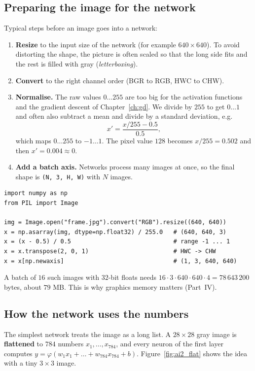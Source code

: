 \subsection*{Preparing the image for the network}
Typical steps before an image goes into a network:
\begin{enumerate}[nosep]
  \item \textbf{Resize} to the input size of the network (for example $640\times640$). To avoid distorting the shape, the picture is often scaled so that the long side fits and the rest is filled with gray (\emph{letterboxing}).
  \item \textbf{Convert} to the right channel order (BGR to RGB, HWC to CHW).
  \item \textbf{Normalise.} The raw values $0\ldots255$ are too big for the activation functions and the gradient descent of Chapter~\ref{ch:gd}. We divide by $255$ to get $0\ldots1$ and often also subtract a mean and divide by a standard deviation, e.g.
  \[
  x'=\frac{x/255-0.5}{0.5},
  \]
  which maps $0\ldots255$ to $-1\ldots1$. The pixel value $128$ becomes $x/255=0.502$ and then $x'=0.004\approx0$.
  \item \textbf{Add a batch axis.} Networks process many images at once, so the final shape is \texttt{(N, 3, H, W)} with $N$ images.
\end{enumerate}
\begin{verbatim}
import numpy as np
from PIL import Image

img = Image.open("frame.jpg").convert("RGB").resize((640, 640))
x = np.asarray(img, dtype=np.float32) / 255.0   # (640, 640, 3)
x = (x - 0.5) / 0.5                             # range -1 ... 1
x = x.transpose(2, 0, 1)                        # HWC -> CHW
x = x[np.newaxis]                               # (1, 3, 640, 640)
\end{verbatim}
A batch of $16$ such images with $32$-bit floats needs $16\cdot3\cdot640\cdot640\cdot4=78\,643\,200$ bytes, about $79$ MB. This is why graphics memory matters (Part~IV).

\subsection*{How the network uses the numbers}
The simplest network treats the image as a long list. A $28\times28$ gray image is \textbf{flattened} to $784$ numbers $x_1,\dots,x_{784}$, and every neuron of the first layer computes $y=\varphi(w_1x_1+\dots+w_{784}x_{784}+b)$. Figure~\ref{fig:ai2_flat} shows the idea with a tiny $3\times3$ image.

